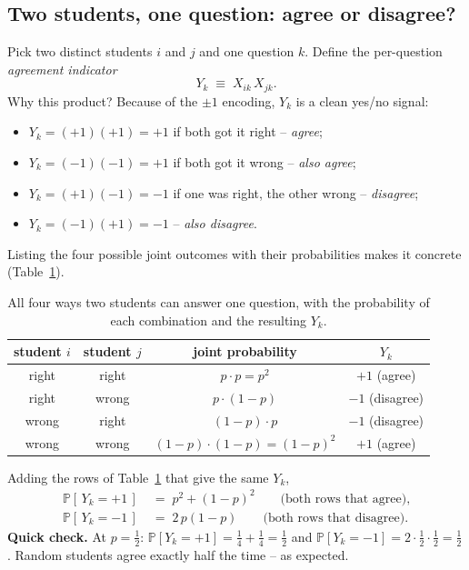 \documentclass[11pt,a4paper]{article}
\renewcommand{\Pr}{\mathbb{P}}
\begin{document}
\subsection{Two students, one question: agree or disagree?}
Pick two distinct students $i$ and $j$ and one question $k$. Define
the per-question \emph{agreement indicator}
\begin{equation}
  Y_k \;\equiv\; X_{ik}\,X_{jk}.
  \label{eq:Yk}
\end{equation}
Why this product? Because of the $\pm 1$ encoding, $Y_k$ is a clean
yes/no signal:
\begin{itemize}[leftmargin=2em,nosep]
  \item $Y_k = (+1)(+1) = +1$ if both got it right -- \emph{agree};
  \item $Y_k = (-1)(-1) = +1$ if both got it wrong -- \emph{also agree};
  \item $Y_k = (+1)(-1) = -1$ if one was right, the other wrong -- \emph{disagree};
  \item $Y_k = (-1)(+1) = -1$ -- \emph{also disagree}.
\end{itemize}
Listing the four possible joint outcomes with their probabilities
makes it concrete (Table~\ref{tab:fourcases}).

\begin{table}[htb]
  \centering
  \begin{tabular}{c c c c}
    \toprule
    student $i$ & student $j$ & joint probability & $Y_k$ \\
    \midrule
    right & right & $p\cdot p = p^2$            & $+1$ (agree) \\
    right & wrong & $p\cdot(1-p)$               & $-1$ (disagree) \\
    wrong & right & $(1-p)\cdot p$              & $-1$ (disagree) \\
    wrong & wrong & $(1-p)\cdot(1-p) = (1-p)^2$ & $+1$ (agree) \\
    \bottomrule
  \end{tabular}
  \caption{All four ways two students can answer one question, with
  the probability of each combination and the resulting $Y_k$.}
  \label{tab:fourcases}
\end{table}

Adding the rows of Table~\ref{tab:fourcases} that give the same
$Y_k$,
\begin{align}
  \Pr[\,Y_k = +1\,] &\;=\; p^2 + (1-p)^2 \qquad\text{(both rows that agree),} \label{eq:pY+1}\\
  \Pr[\,Y_k = -1\,] &\;=\; 2\,p(1-p)     \qquad\text{(both rows that disagree).} \label{eq:pY-1}
\end{align}
\textbf{Quick check.} At $p = \tfrac12$:
$\Pr[Y_k=+1] = \tfrac14 + \tfrac14 = \tfrac12$ and
$\Pr[Y_k=-1] = 2\cdot\tfrac12\cdot\tfrac12 = \tfrac12$. Random students
agree exactly half the time -- as expected.
\end{document}
